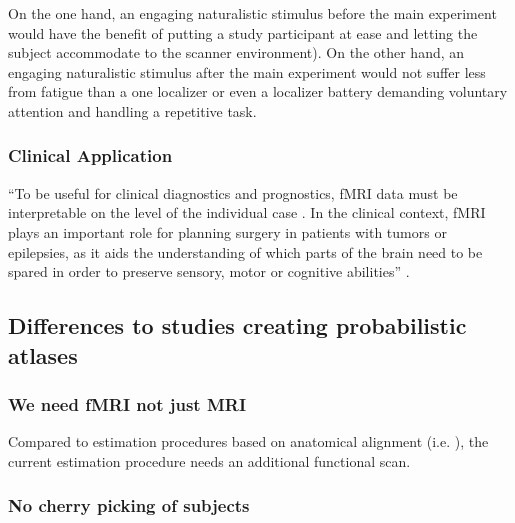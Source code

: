%
On the one hand, an engaging naturalistic stimulus before the main experiment
would have the benefit of putting a study participant at ease and letting the
subject accommodate to the scanner environment).
%
On the other hand, an engaging naturalistic stimulus after the main experiment
would not suffer less from fatigue than a one localizer or even a localizer
battery demanding voluntary attention and handling a repetitive task.


\subsubsection{Clinical Application}


``To be useful for clinical diagnostics and prognostics, fMRI data must be
interpretable on the level of the individual case \citep{dubois2016building}.
%
In the clinical context, fMRI plays an important role for planning surgery in
patients with tumors or epilepsies, as it aids the understanding of which parts
of the brain need to be spared in order to preserve sensory, motor or cognitive
abilities'' \citep{wegrzyn2018thought}.



\subsection{Differences to studies creating probabilistic atlases}


\subsubsection{We need fMRI not just MRI}


%
Compared to estimation procedures based on anatomical alignment (i.e.
\citep{weiner2018defining}), the current estimation procedure needs an
additional functional scan.


\subsubsection{No cherry picking of subjects}


